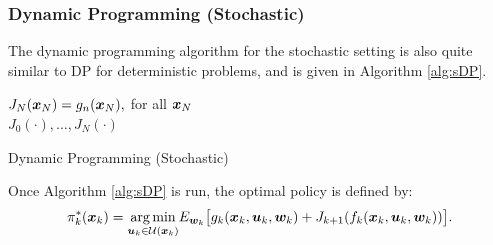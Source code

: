 \subsubsection{Dynamic Programming (Stochastic)}
The dynamic programming algorithm for the stochastic setting is also quite similar to DP for deterministic problems, and is given in Algorithm \ref{alg:sDP}.
\begin{algorithm}[ht]
 $J_N(\bm{x}_N) = g_n(\bm{x}_N),$ for all $\bm{x}_N$\\
 \Return $J_0(\cdot),\dots,J_N(\cdot)$
 \caption{Dynamic Programming (Stochastic)}
 \label{alg:sDP}
\end{algorithm}
Once Algorithm \ref{alg:sDP} is run, the optimal policy is defined by:
\begin{equation*}
\pi^*_k(\bm{x}_k) = \underset{\bm{u}_k \in \mathcal{U}(\bm{x}_k)}{\arg \min}E_{\bm{w}_k}\big[g_k(\bm{x}_k,\bm{u}_k,\bm{w}_k) + J_{k+1}(f_k(\bm{x}_k, \bm{u}_k, \bm{w}_k))\big].
\end{equation*}

